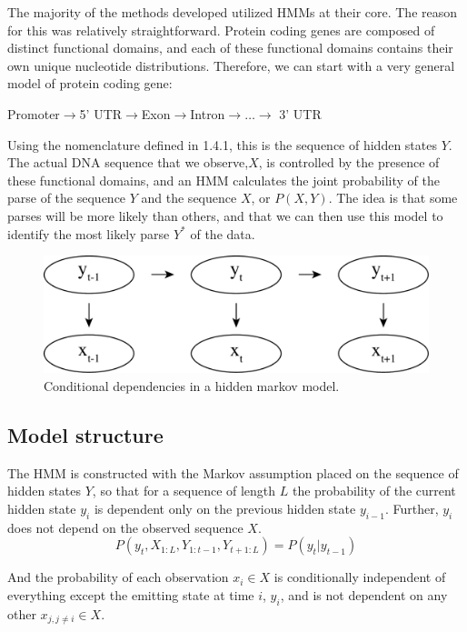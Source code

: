 The majority of the methods developed utilized HMMs at their core. The reason for this was relatively straightforward. Protein coding genes are composed of distinct functional domains, and each of these functional domains contains their own unique nucleotide distributions. Therefore, we can start with a very general model of protein coding gene:

\begin{center}
    Promoter$\rightarrow$5' UTR$\rightarrow$Exon$\rightarrow$Intron$\rightarrow \dots \rightarrow$ 3' UTR
\end{center}

Using the nomenclature defined in 1.4.1, this is the sequence of hidden states $Y$. The actual DNA sequence that we observe,$X$, is controlled by the presence of these functional domains, and an HMM calculates the joint probability of the parse of the sequence $Y$ and the sequence $X$, or $P(X,Y)$. The idea is that some parses will be more likely than others, and that we can then use this model to identify the most likely parse $Y^*$ of the data. 
\begin{figure}[h]
\centering
\includegraphics[width=\textwidth]{images/hmm.pdf}
\caption{Conditional dependencies in a hidden markov model.}
\label{fig:HMM}
\end{figure}
\subsection{Model structure}
The HMM is constructed with the Markov assumption placed on the sequence of hidden states $Y$, so that for a sequence of length $L$ the probability of the current hidden state $y_i$ is dependent only on the previous hidden state $y_{i-1}$. Further, $y_i$ does not depend on the observed sequence $X$. 
\begin{equation}
    P(y_t,X_{1:L},Y_{1:t-1},Y_{t+1:L}) = P(y_t|y_{t-1})
\end{equation}

And the probability of each observation $x_i \in X$ is conditionally independent of everything except the emitting state at time $i$, $y_i$, and is not dependent on any other $x_{j,j\neq i} \in X$.

